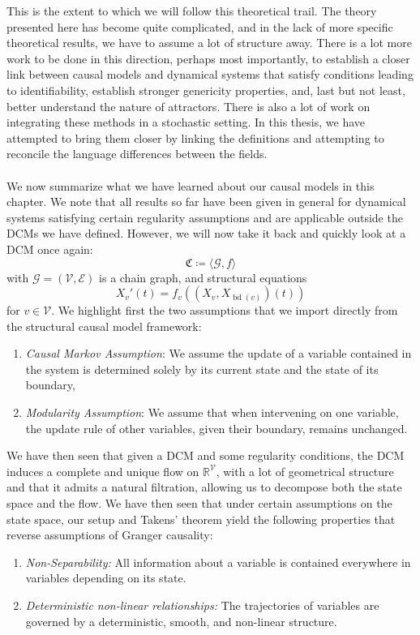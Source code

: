 \documentclass[11pt, a4paper]{memoir}
\theoremstyle{break}
\theoremstyle{break}
\theoremstyle{nonumberplain}
\newcommand{\mR}{\mathbb{R}}
\DeclareMathOperator{\bd}{bd}
\begin{document}
This is the extent to which we will follow this theoretical trail. The theory presented here has become quite complicated, and in the lack of more specific theoretical results, we have to assume a lot of structure away. There is a lot more work to be done in this direction, perhaps most importantly, to establish a closer link between causal models and dynamical systems that satisfy conditions leading to identifiability, establish stronger genericity properties, and, last but not least, better understand the nature of attractors. There is also a lot of work on integrating these methods in a stochastic setting. In this thesis, we have attempted to bring them closer by linking the definitions and attempting to reconcile the language differences between the fields.\\\\
We now summarize what we have learned about our causal models in this chapter. We note that all results so far have been given in general for dynamical systems satisfying certain regularity assumptions and are applicable outside the DCMs we have defined. However, we will now take it back and quickly look at a DCM once again:
$$\mathfrak{C}\coloneqq \langle \mathcal{G}, f\rangle$$
with $\mathcal{G}=(\mathcal{V},\mathcal{E})$ is a chain graph, and structural equations
$$X_v'(t)=f_v((X_v,X_{\bd(v)})(t))$$
for $v\in \mathcal{V}$. We highlight first the two assumptions that we import directly  from the structural causal model framework:
\begin{enumerate}[itemindent=15pt,label=(SC\arabic*)]
	\item \emph{Causal Markov Assumption}: We assume the update of a variable contained in the system is determined solely by its current state and the state of its boundary,
	\item \emph{Modularity Assumption}: We assume that when intervening on one variable, the update rule of other variables, given their boundary, remains unchanged.
\end{enumerate}
We have then seen that given a DCM and some regularity conditions, the DCM induces a complete and unique flow on $\mR^\mathcal{V}$, with a lot of geometrical structure and that it admits a natural filtration, allowing us to decompose both the state space and the flow. We have then seen that under certain assumptions on the state space, our setup and Takens' theorem yield the following properties that reverse assumptions of Granger causality:
\begin{enumerate}[itemindent=15pt,label=(TT\arabic*)]
	\item \emph{Non-Separability:} All information about a variable is contained everywhere in variables depending on its state.
	\item \emph{Deterministic non-linear relationships:} The trajectories of variables are governed by a deterministic, smooth, and non-linear structure.
\end{enumerate}
\end{document}
